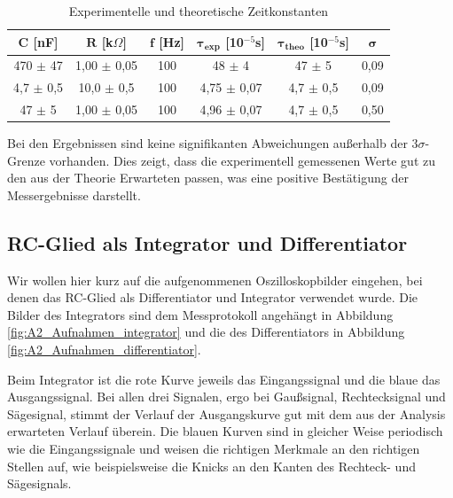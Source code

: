 \documentclass{article}
\begin{document}
\phantom{.}

\begin{table}[!h]
    \centering
    \begin{tabular}{cccccc}
        \hline
        $\bm{C}$ [nF] & $\bm{R}$ [k$\Omega$] & $\bm{f}$ [Hz] & $\bm{\tau_{exp}}$ [10$^{-5}$s] & $\bm{\tau_{theo}}$ [10$^{-5}$s] & $\bm{\sigma}$ \\ \hline
         470 $\pm$ 47 &  1,00 $\pm$   0,05 & 100 & 48 $\pm$ 4 & 47 $\pm$ 5 & 0,09 \\
         4,7 $\pm$ 0,5 & 10,0 $\pm$  0,5 & 100 & 4,75 $\pm$ 0,07 & 4,7 $\pm$ 0,5 & 0,09 \\
         47 $\pm$ 5 &  1,00 $\pm$   0,05 & 100 & 4,96 $\pm$ 0,07 & 4,7 $\pm$ 0,5 & 0,50  \\ \hline
    \end{tabular}%
    \caption{Experimentelle und theoretische Zeitkonstanten}
    \label{tab:A1-Zeitkonst}
\end{table}

\phantom{.}

Bei den Ergebnissen sind keine signifikanten Abweichungen außerhalb der $3\sigma$-Grenze vorhanden. Dies zeigt, dass die experimentell gemessenen Werte gut zu den aus der Theorie Erwarteten passen, was eine positive Bestätigung der Messergebnisse darstellt.


\clearpage
\newpage

\subsection{RC-Glied als Integrator und Differentiator}

Wir wollen hier kurz auf die aufgenommenen Oszilloskopbilder eingehen, bei denen das RC-Glied als Differentiator und Integrator verwendet wurde. Die Bilder des Integrators sind dem Messprotokoll angehängt in Abbildung \ref{fig:A2_Aufnahmen_integrator} und die des Differentiators in Abbildung \ref{fig:A2_Aufnahmen_differentiator}. 

Beim Integrator ist die rote Kurve jeweils das Eingangssignal und die blaue das Ausgangssignal. Bei allen drei Signalen, ergo bei Gaußsignal, Rechtecksignal und Sägesignal, stimmt der Verlauf der Ausgangskurve gut mit dem aus der Analysis erwarteten Verlauf überein. Die blauen Kurven sind in gleicher Weise periodisch wie die Eingangssignale und weisen die richtigen Merkmale an den richtigen Stellen auf, wie beispielsweise die Knicks an den Kanten des Rechteck- und Sägesignals. 
\end{document}
